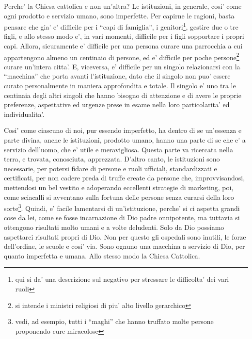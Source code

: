 Perche' la Chiesa cattolica e non un'altra? Le istituzioni, in generale, cosi' come ogni prodotto e servizio umano, sono imperfette. Per capirne le ragioni, basta pensare che gia' e' difficile per i ``capi di famiglia'', i genitori\footnote{qui si da' una descrizione sul negativo per stressare le difficolta' dei vari ruoli}, gestire due o tre figli, e allo stesso modo e', in vari momenti, difficile per i figli sopportare i propri capi. 
Allora, sicuramente e' difficile per una persona curare una parrocchia a cui appartengono almeno un centinaio di persone, ed e' difficile per poche persone\footnote{si intende i ministri religiosi di piu' alto livello gerarchico} curare un'intera citta'. E, viceversa, e' difficile per un singolo relazionarsi con la ``macchina'' che porta avanti l'istituzione, dato che il singolo non puo' essere curato personalmente in maniera approfondita e totale. Il singolo e' uno tra le centinaia degli altri singoli che hanno bisogno di attenzione e di avere le proprie preferenze, aspettative ed urgenze prese in esame nella loro particolarita' ed individualita'.

Cosi' come ciascuno di noi, pur essendo imperfetto, ha dentro di se un'essenza e parte divina, anche le istituzioni, prodotto umano, hanno una parte di se che e' a servizio dell'uomo, che e' utile e meravigliosa. Questa parte va ricercata nella terra, e trovata, conosciuta, apprezzata. 
D'altro canto, le istituzioni sono necessarie, per potersi fidare di persone e ruoli ufficiali, standardizzati e certificati, per non cadere preda di truffe create da persone che, improvvisandosi, mettendosi un bel vestito e adoperando eccellenti strategie di marketing, poi, come sciacalli si avventano sulla fortuna delle persone senza curarsi della loro sorte\footnote{vedi, ad esempio, tutti i ``maghi'' che hanno truffato molte persone proponendo cure miracolose}.
Quindi, e' facile lamentarsi di un'istituzione, perche' si ci aspetta grandi cose da lei, come se fosse incarnazione di Dio padre onnipotente, ma tuttavia si ottengono risultati molto umani e a volte deludenti. 
Solo da Dio possiamo aspettarci risultati propri di Dio.
Non per questo gli ospedali sono inutili, le forze dell'ordine, le scuole e cosi' via. Sono ognuno una macchina a servizio di Dio, per quanto imperfetta e umana. Allo stesso modo la Chiesa Cattolica.

